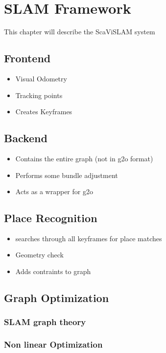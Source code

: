 \chapter{SLAM Framework}
\label{chapter:slam_framework}

This chapter will describe the ScaViSLAM system

\section{Frontend}
\begin{itemize}
\itemsep0em
 \item Visual Odometry
 \item Tracking points
 \item Creates Keyframes
\end{itemize}

\section{Backend}
\begin{itemize}
\itemsep0em
 \item Contains the entire graph (not in g2o format)
 \item Performs some bundle adjustment
 \item Acts as a wrapper for g2o
\end{itemize}

\section{Place Recognition}
\begin{itemize}
\itemsep0em
 \item searches through all keyframes for place matches
 \item Geometry check
 \item Adds contraints to graph
\end{itemize}

\section{Graph Optimization}

\subsection{SLAM graph theory}
\subsection{Non linear Optimization}
